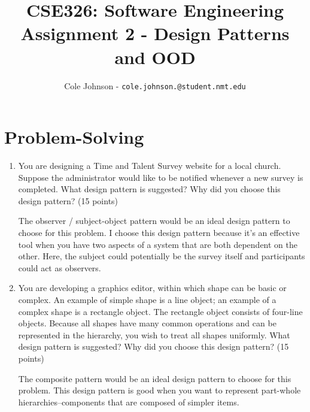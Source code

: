 \documentclass[english,12pt]{article}
\author{
    Cole Johnson - \texttt{cole.johnson.@student.nmt.edu}
}
\title{
    \textbf{CSE326: Software Engineering} \\
    \LARGE{Assignment 2 - Design Patterns and OOD}
}
\begin{document}
 \maketitle
 \section*{Problem-Solving}
 \frenchspacing
 \begin{enumerate}[\bf (1.)]
  \item You are designing a Time and Talent Survey website for a local church. 
  Suppose the administrator would like to be notified whenever a new survey is completed.
  What design pattern is suggested? Why did you choose 
  this design pattern? (15 points)

  The observer / subject-object pattern would be an ideal design pattern to choose for this problem.
  I choose this design pattern because it's an effective tool when you have two aspects of a
  system that are both dependent on the other. Here, the subject could potentially be the survey 
  itself and participants could act as observers. 

  \item You are developing a graphics editor, within which shape can be basic or complex. 
  An example of simple shape is a line object; an example of a complex shape 
  is a rectangle object. The rectangle object consists of four-line objects. 
  Because all shapes have many common operations and can be represented in the 
  hierarchy, you wish to treat all shapes uniformly.
  What design pattern is suggested? Why did you choose this design pattern? 
  (15 points)

 The composite pattern would be an ideal design pattern to choose for this problem.
 This design pattern is good when you want to represent part-whole hierarchies--components
 that are composed of simpler items.
 \end{enumerate}
\pagebreak 
\end{document}
